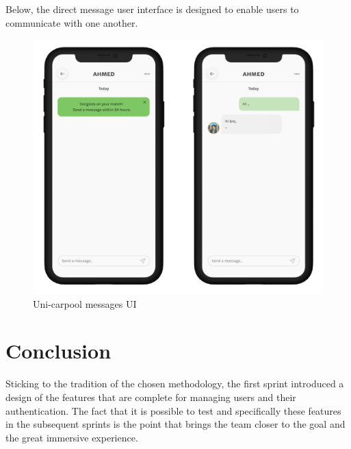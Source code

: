 Below, the direct message user interface is designed to enable users to communicate with one another.
\begin{figure}[H] 
            \centering
            \includegraphics[scale=0.2]{ui/unicarpool messaging.png}
            \caption{Uni-carpool messages UI} 
            \label{fig: messages UI}
\end{figure}

\section*{Conclusion}
Sticking to the tradition of the chosen methodology, the first sprint introduced a design of the features that are complete for managing users and their authentication. The fact that it is possible to test and specifically these features in the subsequent sprints is the point that brings the team closer to the goal and the great immersive experience. 

